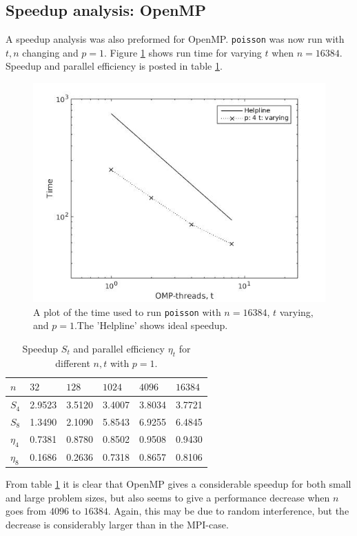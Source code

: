 \documentclass{article}
\begin{document}
\subsection{Speedup analysis: OpenMP}
A speedup analysis was also preformed for OpenMP. \texttt{poisson} was now run with $t,n$ changing and $p=1$. Figure \ref{fig:omp} shows run time for varying $t$ when $n = 16384$. Speedup and parallel efficiency is posted in table \ref{tab:omp}.
\begin{figure}[h]
    \centering
    \includegraphics[width = 0.6\linewidth]{omp}
    \caption{A plot of the time used to run \texttt{poisson} with $n = 16384$, $t$ varying, and $p = 1$.The 'Helpline' shows ideal speedup.}
    \label{fig:omp}
\end{figure}
\begin{table}[h]
    \centering
    \begin{tabular}{ll|llll}
    $n$ & $32$ & $128$ & $1024$ & $4096$ & $16384$ \\ 
    \hline
    $S_4$&    2.9523&    3.5120&    3.4007&    3.8034&    3.7721\\
    $S_8$&    1.3490&    2.1090&    5.8543&    6.9255&    6.4845\\
    \hline
    $\eta_4$ &      0.7381  &  0.8780&    0.8502&    0.9508&    0.9430\\
    $\eta_8$ &      0.1686  &  0.2636&    0.7318&    0.8657&    0.8106\\
\end{tabular}
\caption{Speedup $S_t$ and parallel efficiency $\eta_t$ for different $n,t$ with $p=1$.}
\label{tab:omp}
\end{table}
From table \ref{tab:omp} it is clear that OpenMP gives a considerable speedup for both small and large problem sizes, but also seems to give a performance decrease when $n$ goes from $4096$ to $16384$. Again, this may be due to random interference, but the decrease is considerably larger than in the MPI-case. %
\end{document}
